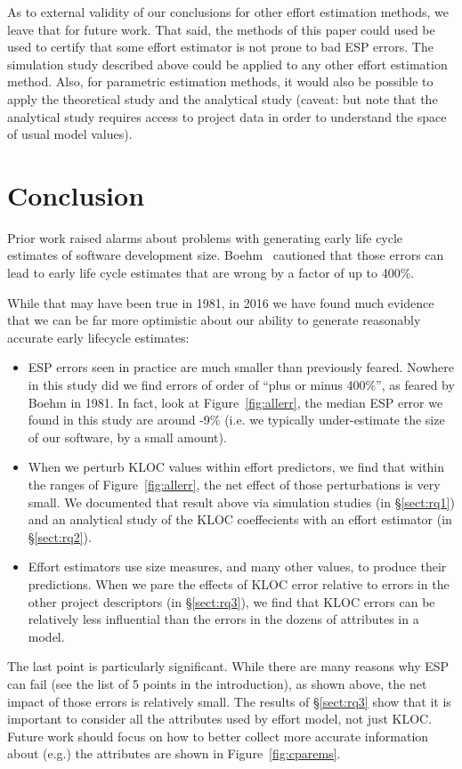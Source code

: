 \documentclass[final,twocolumn]{elsarticle}
\newcommand{\bi}{\begin{itemize}[leftmargin=0.4cm]}
\newcommand{\ei}{\end{itemize}}
\newcommand{\tion}[1]{\S\ref{sect:#1}}
\newcommand{\fig}[1]{Figure~\ref{fig:#1}}
\theoremstyle{break}
\begin{document}
As to external validity of our conclusions for  other effort estimation methods, we leave that for future work.
  That said, the methods of this paper could used be used to  certify that some effort
  estimator  is not prone to bad ESP
  errors.  The simulation study described above
   could be applied to any other
   effort estimation method. Also, for parametric estimation methods, it would also be possible to apply
   the theoretical study and the analytical study  (caveat: but
   note that the analytical study requires access to project data in order to understand the space of
  usual model values).
  
  

  
  
\section{Conclusion}
Prior work raised alarms about problems with generating early life cycle estimates of software
development size. Boehm~\cite{boehm81} cautioned that those errors can lead to early life cycle
estimates that are  wrong by a factor of up to  400\%.

While that may have been true in 1981, in 2016 we have found much evidence that we can be far more optimistic about
our ability to generate reasonably accurate early lifecycle estimates:
\bi
\item
ESP errors seen in practice are much smaller than previously feared. Nowhere in
this study did we find errors of order of ``plus or minus 400\%'', as feared
by Boehm in 1981. In fact, look at \fig{allerr}, the median ESP error we found in
this study are around -9\% (i.e. we typically under-estimate the size of our software, by a small amount).
\item
When we perturb KLOC values within effort predictors, we find that within the ranges
of \fig{allerr}, the net effect of those perturbations is very small. We documented that result above via simulation studies (in \tion{rq1}) and an analytical study of the KLOC coeffecients with an effort estimator (in \tion{rq2}).
\item
Effort estimators
use size measures, and many other values, to produce their predictions.  When we
pare the effects of KLOC error relative to errors in the other project
descriptors (in \tion{rq3}), we find that KLOC errors can be relatively less 
influential than the errors in the dozens of attributes in a model.
\ei
The last point is particularly significant. While there are many reasons why ESP can fail (see the
list of 5 points in the introduction),
as shown above, the net impact of those errors is relatively small. The results of \tion{rq3}
show that it is important to consider all the attributes used by  effort model, not just KLOC.  
Future work should focus on how to better collect more accurate information about (e.g.)
the attributes are shown in \fig{cparems}.  
\end{document}
